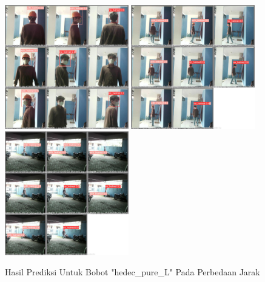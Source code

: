 \begin{enumerate}
  \begin{figure} [h!]
    \centering
    \includegraphics[width=0.48\textwidth]{gambar/BerdasarkanJarak_v2/val_hedec_pure_L/Jarak1_3/val_batch0_pred.jpg}
    \includegraphics[width=0.48\textwidth]{gambar/BerdasarkanJarak_v2/val_hedec_pure_L/Jarak5_3/val_batch0_pred.jpg}
    \includegraphics[width=0.48\textwidth]{gambar/BerdasarkanJarak_v2/val_hedec_pure_L/Jarak9/val_batch0_pred.jpg}
    \caption{Hasil Prediksi Untuk Bobot "hedec\_pure\_L" Pada Perbedaan Jarak}
    \label{fig:valjarak_sample_hedec_pure_L}  
  \end{figure}



\end{enumerate}



